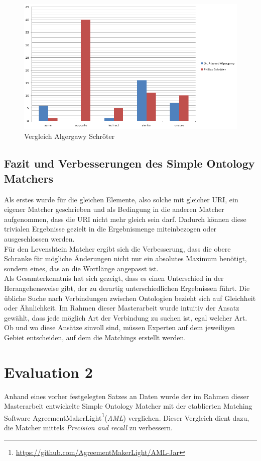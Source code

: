 		\begin{figure}[h!]
		\centering
		\includegraphics[width=1.0\textwidth]{pics/Vergleich-Algergawy-Schroeter_2016-11-22.png}
		\caption{Vergleich Algergawy Schröter}
		\label{fig16}
		\end{figure}
		
		\subsection{Fazit und Verbesserungen des Simple Ontology Matchers}
		Als erstes wurde für die gleichen Elemente, also solche mit gleicher URI, ein
		eigener Matcher geschrieben und als Bedingung in die anderen Matcher
		aufgenommen, dass die URI nicht mehr gleich sein darf. Dadurch können diese
		trivialen Ergebnisse gezielt in die Ergebnismenge miteinbezogen oder
		ausgeschlossen werden.\\
		Für den Levenshtein Matcher ergibt sich die Verbesserung, dass die obere
		Schranke für mögliche Änderungen nicht nur ein absolutes Maximum benötigt,
		sondern eines, das an die Wortlänge angepasst ist.\\
		Als Gesamterkenntnis hat sich gezeigt, dass es einen Unterschied in der
		Herangehensweise gibt, der zu derartig unterschiedlichen Ergebnissen führt.
		Die übliche Suche nach Verbindungen zwischen Ontologien bezieht sich auf
		Gleichheit oder Ähnlichkeit. Im Rahmen dieser Masterarbeit wurde intuitiv der
		Ansatz gewählt, dass jede möglich Art der Verbindung zu suchen ist, egal
		welcher Art. Ob und wo diese Ansätze sinvoll sind, müssen Experten auf dem
		jeweiligen Gebiet entscheiden, auf dem die Matchings erstellt werden.
		
		\section{Evaluation 2}
		\label{subsec:Evaluation 2}
		Anhand eines vorher festgelegten Satzes an Daten wurde der im Rahmen dieser
		Masterarbeit entwickelte Simple Ontology Matcher mit der etablierten Matching
		Software
		AgreementMakerLight\footnote{\url{https://github.com/AgreementMakerLight/AML-Jar}}(\textit{AML})
		verglichen. Dieser Vergleich dient dazu, die Matcher mittels \textit{Precision
		and recall} zu verbessern.
		
